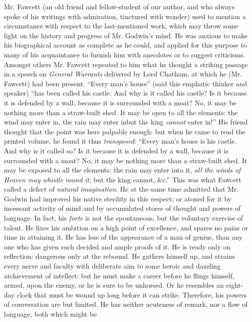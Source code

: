 Mr. Fawcett (an old friend and fellow-student of our author, and
who always spoke of his writings with admiration, tinctured with
wonder) used to mention a circumstance with respect to the
last-mentioned work, which may throw some light on the history and
progress of Mr. Godwin's mind. He was anxious to make his
biographical account as complete as he could, and applied for this
purpose to many of his acquaintance to furnish him with anecdotes
or to suggest criticisms. Amongst others Mr.  Fawcett repeated to
him what he thought a striking passage in a speech on
\emph{General Warrants} delivered by Lord Chatham, at which he
(Mr.  Fawcett) had been present. ``Every man's house'' (said this
emphatic thinker and speaker) ``has been called his castle. And
why is it called his castle? Is it because it is defended by a
wall, because it is surrounded with a moat? No, it may be nothing
more than a straw-built shed. It may be open to all the elements:
the wind may enter in, the rain may enter in\textemdash but the
king \emph{cannot} enter in!'' His friend thought that the point
was here palpable enough: but when he came to read the printed
volume, he found it thus \emph{transposed}: ``Every man's house is
his castle. And why is it called so? Is it because it is defended
by a wall, because it is surrounded with a moat? No, it may be
nothing more than a straw-built shed. It may be exposed to all the
elements: the rain may enter into it, \emph{all the winds of
Heaven may whistle round it}, but the king cannot, \&c.'' This was
what Fawcett called a defect of \emph{natural imagination}. He at
the same time admitted that Mr. Godwin had improved his native
sterility in this respect; or atoned for it by incessant activity
of mind and by accumulated stores of thought and powers of
language. In fact, his \emph{forte} is not the spontaneous, but
the voluntary exercise of talent. He fixes his ambition on a high
point of excellence, and spares no pains or time in attaining
it. He has less of the appearance of a man of genius, than any one
who has given such decided and ample proofs of it. He is ready
only on reflection: dangerous only at the rebound. He gathers
himself up, and strains every nerve and faculty with deliberate
aim to some heroic and dazzling atchievement of intellect: but he
must make a career before he flings himself, armed, upon the
enemy, or he is sure to be unhorsed. Or he resembles an eight-day
clock that must be wound up long before it can strike.  Therefore,
his powers of conversation are but limited. He has neither
acuteness of remark, nor a flow of language, both which might be
